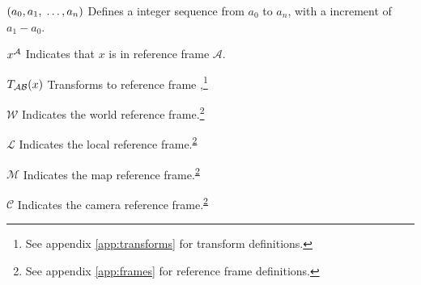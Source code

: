 \begin{Nomencl}[2.75cm]
% 
    \item[\((a_0,a_1,\;\dots,a_n)\)] Defines a integer sequence from \(a_0\) to \(a_n\), with a increment of \(a_1-a_0\).
    \item[\(x^\mathcal{A}\)] Indicates that \(x\) is in reference frame \(\mathcal{A}\).
    \item[\(\transframenew{x}{\refframe{A}}{\refframe{B}}\)] Transforms  to reference frame ,\footnote{See appendix \ref{app:transforms} for transform definitions.}
    \item[\(\mathcal{W}\)] Indicates the world reference frame.\footnote{\label{note1}See appendix \ref{app:frames} for reference frame definitions.}
    \item[\(\mathcal{L}\)] Indicates the local reference frame.\textsuperscript{\ref{note1}}
    \item[\(\mathcal{M}\)] Indicates the map reference frame.\textsuperscript{\ref{note1}}
    \item[\(\mathcal{C}\)] Indicates the camera reference frame.\textsuperscript{\ref{note1}}
\end{Nomencl}

